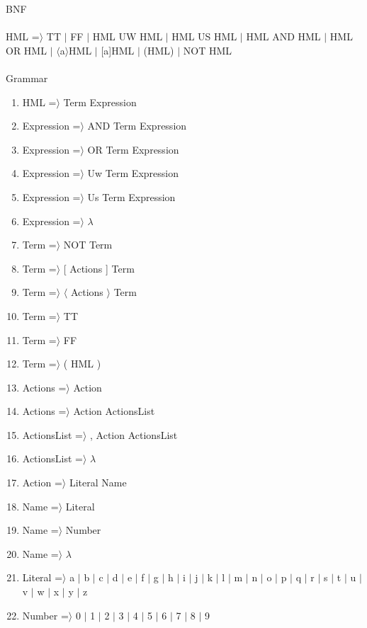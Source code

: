 BNF\\\\
HML =$\rangle$ TT $\vert$ FF $\vert$ HML UW HML $\vert$ HML US HML $\vert$ HML AND HML $\vert$ HML OR HML $\vert$ $\langle$a$\rangle$HML $\vert$ [a]HML $\vert$ (HML) $\vert$ NOT HML
\\\\
Grammar\\
\begin{enumerate}
\item HML =$\rangle$ Term Expression
\item Expression =$\rangle$ AND Term Expression
\item Expression =$\rangle$ OR Term Expression
\item Expression =$\rangle$ Uw Term Expression
\item Expression =$\rangle$ Us Term Expression
\item Expression =$\rangle$ $\lambda$
\item Term =$\rangle$ NOT Term
\item Term =$\rangle$ [ Actions ] Term
\item Term =$\rangle$ $\langle$ Actions $\rangle$ Term
\item Term =$\rangle$ TT
\item Term =$\rangle$ FF
\item Term =$\rangle$ ( HML )
\item Actions =$\rangle$ Action
\item Actions =$\rangle$ { Action ActionsList }
\item ActionsList =$\rangle$ , Action ActionsList
\item ActionsList =$\rangle$ $\lambda$
\item Action =$\rangle$ Literal Name
\item Name =$\rangle$ Literal
\item Name =$\rangle$ Number
\item Name =$\rangle$ $\lambda$
\item Literal =$\rangle$ a $\vert$ b $\vert$ c $\vert$ d $\vert$ e $\vert$ f $\vert$ g $\vert$ h $\vert$ i $\vert$ j $\vert$ k $\vert$ l $\vert$ m $\vert$ n $\vert$ o $\vert$ p $\vert$ q $\vert$ r $\vert$ s $\vert$ t $\vert$ u $\vert$ v $\vert$ w $\vert$ x $\vert$ y $\vert$ z
\item Number =$\rangle$ 0 $\vert$ 1 $\vert$ 2 $\vert$ 3 $\vert$ 4 $\vert$ 5 $\vert$ 6 $\vert$ 7 $\vert$ 8 $\vert$ 9
\end{enumerate}


